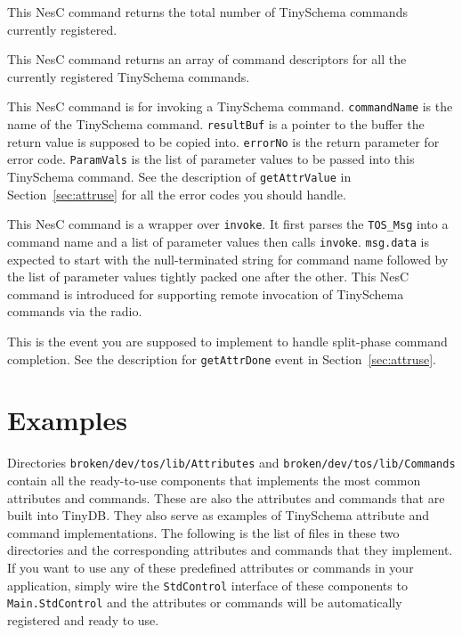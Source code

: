 \documentclass[11pt]{article}
\newcommand{\docroot}{broken/dev}
\begin{document}

This NesC command returns the total number of TinySchema commands
currently registered.



This NesC command returns an array of command descriptors for all
the currently registered TinySchema commands.



This NesC command is for invoking a TinySchema command.  {\tt commandName} is
the name of the TinySchema command.  {\tt resultBuf} is a pointer to
the buffer the return value is supposed to be copied into.  {\tt errorNo} is
the return parameter for error code.  {\tt ParamVals} is the
list of parameter values to be passed into this TinySchema command.
See the description of {\tt getAttrValue} in Section~\ref{sec:attruse}
for all the error codes you should handle.



This NesC command is a wrapper over {\tt invoke}.  It first parses the
{\tt TOS\_Msg} into a command name and a list of parameter values then calls
{\tt invoke}.  {\tt msg.data} is expected to start with the null-terminated
string for command name followed by the list of parameter values tightly
packed one after the other.  This NesC command is introduced for
supporting remote invocation of TinySchema commands via the radio.



This is the event you are supposed to implement to handle split-phase
command completion.  See the description for {\tt getAttrDone} event
in Section~\ref{sec:attruse}.

\section{Examples}

Directories {\tt \docroot/tos/lib/Attributes} and 
{\tt \docroot/tos/lib/Commands}
contain all the ready-to-use components that implements
the most common attributes and commands.
These are also the attributes and commands that are built into TinyDB.
They also serve as examples of TinySchema attribute and 
command implementations. 
The following is the list of files in these two directories and the
corresponding attributes and commands that they implement.  If you want to
use any of these predefined attributes or commands in your application,
simply wire the {\tt StdControl} interface of these components to 
{\tt Main.StdControl} and the attributes or commands will be automatically
registered and ready to use.
\end{document}
